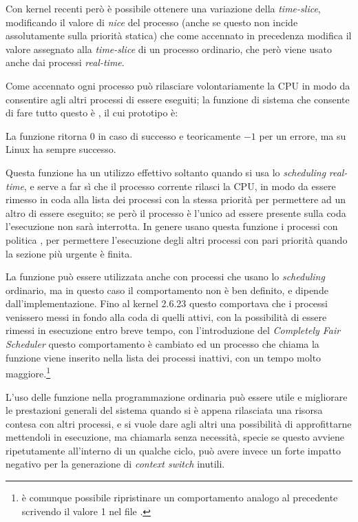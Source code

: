 Con kernel recenti però è possibile ottenere una variazione della
\textit{time-slice}, modificando il valore di \textit{nice} del processo
(anche se questo non incide assolutamente sulla priorità statica) che come
accennato in precedenza modifica il valore assegnato alla \textit{time-slice}
di un processo ordinario, che però viene usato anche dai processi
\textit{real-time}.

Come accennato ogni processo può rilasciare volontariamente la CPU in modo da
consentire agli altri processi di essere eseguiti; la funzione di sistema che
consente di fare tutto questo è , il cui prototipo è:

\begin{funcproto}{ 
}
{La funzione ritorna $0$ in caso di successo e teoricamente $-1$ per un
  errore, ma su Linux ha sempre successo.}
\end{funcproto}


Questa funzione ha un utilizzo effettivo soltanto quando si usa lo
\textit{scheduling} \textit{real-time}, e serve a far sì che il processo
corrente rilasci la CPU, in modo da essere rimesso in coda alla lista dei
processi con la stessa priorità per permettere ad un altro di essere eseguito;
se però il processo è l'unico ad essere presente sulla coda l'esecuzione non
sarà interrotta. In genere usano questa funzione i processi con politica
, per permettere l'esecuzione degli altri processi con pari
priorità quando la sezione più urgente è finita.

La funzione può essere utilizzata anche con processi che usano lo
\textit{scheduling} ordinario, ma in questo caso il comportamento non è ben
definito, e dipende dall'implementazione. Fino al kernel 2.6.23 questo
comportava che i processi venissero messi in fondo alla coda di quelli attivi,
con la possibilità di essere rimessi in esecuzione entro breve tempo, con
l'introduzione del \textit{Completely Fair Scheduler} questo comportamento è
cambiato ed un processo che chiama la funzione viene inserito nella lista dei
processi inattivi, con un tempo molto maggiore.\footnote{è comunque possibile
  ripristinare un comportamento analogo al precedente scrivendo il valore 1
  nel file .}

L'uso delle funzione nella programmazione ordinaria può essere utile e
migliorare le prestazioni generali del sistema quando si è appena rilasciata
una risorsa contesa con altri processi, e si vuole dare agli altri una
possibilità di approfittarne mettendoli in esecuzione, ma chiamarla senza
necessità, specie se questo avviene ripetutamente all'interno di un qualche
ciclo, può avere invece un forte impatto negativo per la generazione di
\textit{context switch} inutili.


